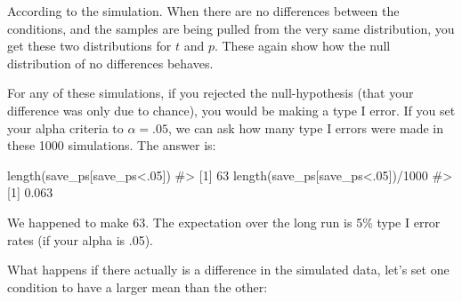 \documentclass[
  letterpaper,
  DIV=11,
  numbers=noendperiod]{scrreprt}
\newenvironment{Shaded}{\begin{snugshade}}{\end{snugshade}}
\newcommand{\AttributeTok}[1]{\textcolor[rgb]{0.40,0.45,0.13}{#1}}
\newcommand{\CommentTok}[1]{\textcolor[rgb]{0.37,0.37,0.37}{#1}}
\newcommand{\ControlFlowTok}[1]{\textcolor[rgb]{0.00,0.23,0.31}{\textbf{#1}}}
\newcommand{\DecValTok}[1]{\textcolor[rgb]{0.68,0.00,0.00}{#1}}
\newcommand{\FunctionTok}[1]{\textcolor[rgb]{0.28,0.35,0.67}{#1}}
\newcommand{\NormalTok}[1]{\textcolor[rgb]{0.00,0.23,0.31}{#1}}
\newcommand{\OtherTok}[1]{\textcolor[rgb]{0.00,0.23,0.31}{#1}}
\newcommand{\SpecialCharTok}[1]{\textcolor[rgb]{0.37,0.37,0.37}{#1}}
\begin{document}
According to the simulation. When there are no differences between the
conditions, and the samples are being pulled from the very same
distribution, you get these two distributions for \(t\) and \(p\). These
again show how the null distribution of no differences behaves.

For any of these simulations, if you rejected the null-hypothesis (that
your difference was only due to chance), you would be making a type I
error. If you set your alpha criteria to \(\alpha = .05\), we can ask
how many type I errors were made in these 1000 simulations. The answer
is:

\begin{Shaded}
\begin{Highlighting}[]
\FunctionTok{length}\NormalTok{(save\_ps[save\_ps}\SpecialCharTok{\textless{}}\NormalTok{.}\DecValTok{05}\NormalTok{])}
\CommentTok{\#\textgreater{} [1] 63}
\FunctionTok{length}\NormalTok{(save\_ps[save\_ps}\SpecialCharTok{\textless{}}\NormalTok{.}\DecValTok{05}\NormalTok{])}\SpecialCharTok{/}\DecValTok{1000}
\CommentTok{\#\textgreater{} [1] 0.063}
\end{Highlighting}
\end{Shaded}

We happened to make 63. The expectation over the long run is 5\% type I
error rates (if your alpha is .05).

What happens if there actually is a difference in the simulated data,
let's set one condition to have a larger mean than the other:

\begin{Shaded}
\end{Shaded}
\end{document}

